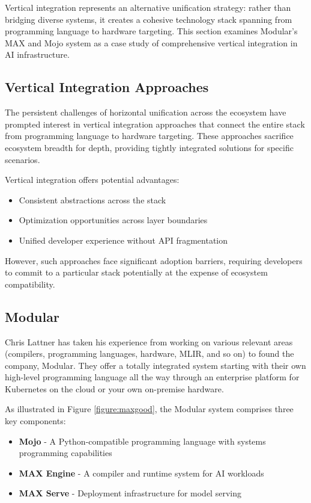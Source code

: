 \documentclass[manuscript,screen,review,format=acmsmall]{acmart}
\begin{document}
Vertical integration represents an alternative unification strategy: rather than bridging diverse systems, it creates a cohesive technology stack spanning from programming language to hardware targeting. This section examines Modular's MAX and Mojo system as a case study of comprehensive vertical integration in AI infrastructure.

\subsection{Vertical Integration Approaches}

The persistent challenges of horizontal unification across the ecosystem have prompted interest in vertical integration approaches that connect the entire stack from programming language to hardware targeting. These approaches sacrifice ecosystem breadth for depth, providing tightly integrated solutions for specific scenarios.

Vertical integration offers potential advantages:
\begin{itemize}
    \item Consistent abstractions across the stack
    \item Optimization opportunities across layer boundaries
    \item Unified developer experience without API fragmentation
\end{itemize}

However, such approaches face significant adoption barriers, requiring developers to commit to a particular stack potentially at the expense of ecosystem compatibility.

\subsection{Modular}

Chris Lattner has taken his experience from working on various relevant areas (compilers, programming languages, hardware, MLIR, and so on) to found the company, Modular. They offer a totally integrated system starting with their own high-level programming language all the way through an enterprise platform for Kubernetes on the cloud or your own on-premise hardware.

As illustrated in Figure \ref{figure:maxgood}, the Modular system comprises three key components:
\begin{itemize}
    \item \textbf{Mojo} - A Python-compatible programming language with systems programming capabilities
    \item \textbf{MAX Engine} - A compiler and runtime system for AI workloads
    \item \textbf{MAX Serve} - Deployment infrastructure for model serving
\end{itemize}
\end{document}
